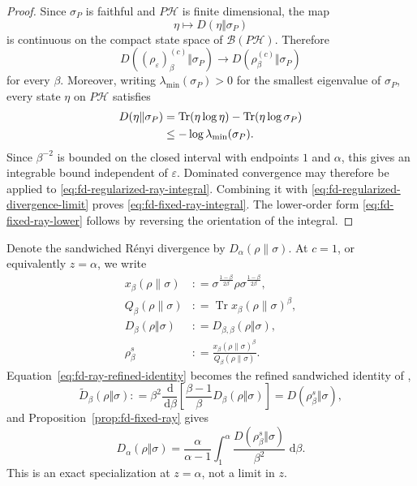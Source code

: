\documentclass[12pt]{article}
\numberwithin{equation}{section}
\theoremstyle{definition}
\theoremstyle{remark}
\newcommand{\dd}{\,\mathrm d}
\newcommand{\?}{\overset{?}{=}}
\newcommand{\defeq}{\mathrel{\mathop:}=}
\DeclareMathOperator{\Tr}{Tr}
\newcommand{\cH}{\mathcal{H}}
\begin{document}
\begin{proof}
Since $\sigma_P$ is faithful and $P\cH$ is finite dimensional, the map
\[
  \eta\longmapsto D(\eta\Vert\sigma_P)
\]
is continuous on the compact state space of $\mathcal B(P\cH)$.
Therefore
\[
  D((\rho_\varepsilon)_\beta^{(c)}\Vert\sigma_P)
  \longrightarrow
  D(\rho_\beta^{(c)}\Vert\sigma_P)
\]
for every $\beta$.  Moreover, writing
$\lambda_{\min}(\sigma_P)>0$ for the smallest eigenvalue of
$\sigma_P$, every state $\eta$ on $P\cH$ satisfies
\begin{align}
  D(\eta\Vert\sigma_P)
  &=\Tr(\eta\log\eta)-\Tr(\eta\log\sigma_P) \notag\\
  &\leq-\log\lambda_{\min}(\sigma_P).
  \label{eq:fd-relative-entropy-uniform-bound}
\end{align}
Since $\beta^{-2}$ is bounded on the closed interval with endpoints
$1$ and $\alpha$, this gives an integrable bound independent of
$\varepsilon$.  Dominated convergence may therefore be applied to
\eqref{eq:fd-regularized-ray-integral}.  Combining it with
\eqref{eq:fd-regularized-divergence-limit} proves
\eqref{eq:fd-fixed-ray-integral}.  The lower-order form
\eqref{eq:fd-fixed-ray-lower} follows by reversing the orientation of
the integral.
\end{proof}

Denote the sandwiched R\'enyi divergence by $D_\alpha(\rho\|\sigma)$. At $c=1$, or equivalently $z=\alpha$, we write
\begin{align}
  x_\beta(\rho\|\sigma)
  &\defeq 
  \sigma^{\frac{1-\beta}{2\beta}}
  \rho
  \sigma^{\frac{1-\beta}{2\beta}},\\
  Q_\beta(\rho\|\sigma)
  &\defeq 
  \Tr x_\beta(\rho\|\sigma)^\beta,\\
  D_\beta(\rho\Vert\sigma)
  &\defeq 
  D_{\beta,\beta}(\rho\Vert\sigma),\\
  \rho_\beta^s
  &\defeq 
  \frac{x_\beta(\rho\|\sigma)^\beta}
       {Q_\beta(\rho\|\sigma)}.
\end{align}
Equation~\eqref{eq:fd-ray-refined-identity} becomes the refined
sandwiched identity of \cite{Bao:2019aol},
\begin{equation}
  \widetilde D_\beta(\rho\Vert\sigma)
  \defeq \beta^2\frac{\dd}{\dd\beta}
    \left[\frac{\beta-1}{\beta}
          D_\beta(\rho\Vert\sigma)\right]
  =D(\rho_\beta^s\Vert\sigma),
  \label{eq:fd-refined-srd}
\end{equation}
and Proposition~\ref{prop:fd-fixed-ray} gives
\begin{equation}
  D_\alpha(\rho\Vert\sigma)
  =\frac{\alpha}{\alpha-1}
   \int_1^\alpha
   \frac{D(\rho_\beta^s\Vert\sigma)}{\beta^2}\,\dd\beta .
  \label{eq:fd-srd-integral}
\end{equation}
This is an exact specialization at $z=\alpha$, not a limit in $z$.
\end{document}
